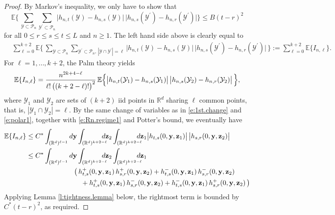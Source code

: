 \documentclass[11pt]{amsart}
\numberwithin{equation}{section}
\theoremstyle{plain}
\theoremstyle{definition}
\begin{document}
\begin{proof}
By Markov's inequality, we only have to show that
\begin{equation}  \label{e:tightness.poisson}
{\mathbb{E}} \biggl\{ \, \sum_{{{\mathcal{Y}}} \subset {\mathcal P_n}} \sum_{{{\mathcal{Y}^{\prime}}} \subset {\mathcal P_n}} \bigl| h_{n,t}({{\mathcal{Y}}}) - h_{n,s}({{\mathcal{Y}}}) \bigr|\, \bigl| h_{n,s}({{\mathcal{Y}^{\prime}}}) - h_{n,r}({{\mathcal{Y}^{\prime}}}) \bigr| \biggr\} \leq B(t-r)^2
\end{equation}
for all $0 \leq r \leq s \leq t \leq L$ and $n \geq 1$. The left hand side above is clearly equal to
\begin{align*}
&\sum_{\ell = 0}^{k+2} {\mathbb{E}} \biggl\{ \, \sum_{{{\mathcal{Y}}} \subset {\mathcal P_n}} \sum_{{{\mathcal{Y}^{\prime}}} \subset {\mathcal P_n}, \, |{{\mathcal{Y}}} \cap {{\mathcal{Y}^{\prime}}}| = \ell} \bigl| h_{n,t}({{\mathcal{Y}}}) - h_{n,s}({{\mathcal{Y}}}) \bigr|\, \bigl| h_{n,s}({{\mathcal{Y}^{\prime}}}) - h_{n,r}({{\mathcal{Y}^{\prime}}}) \bigr|\, \biggr\} := \sum_{\ell =0}^{k+2} {\mathbb{E}} \{ I_{n,\ell} \}.
\end{align*}
For $\ell = 1,\dots,k+2$, the Palm theory yields
$$
{\mathbb{E}} \{ I_{n,\ell} \} = \frac{n^{2k+4-\ell}}{\ell !\, \bigl( (k+2-\ell)! \bigr)^2}\, {\mathbb{E}} \Bigl\{ \bigl|  h_{n,t}({{\mathcal{Y}}}_1) - h_{n,s}({{\mathcal{Y}}}_1) \bigr|\,  \bigl|  h_{n,s}({{\mathcal{Y}}}_2) - h_{n,r}({{\mathcal{Y}}}_2) \bigr|\,  \Bigr\},
$$
where ${{\mathcal{Y}}}_1$ and ${{\mathcal{Y}}}_2$  are sets of $(k+2)$ iid points in ${{\mathbb R}}^d$ sharing $\ell$ common points, that is, $|  {{\mathcal{Y}}}_1 \cap {{\mathcal{Y}}}_2 | = \ell$. By the same change of variables as in \eqref{e:1st.change} and \eqref{e:polar1}, together with \eqref{e:Rn.regime1} and Potter's bound, we eventually have
\begin{align*}
{\mathbb{E}} \{  I_{n,\ell}\} &\leq C^* \int_{({{\mathbb R}}^d)^{\ell -1}}d {{\bf y}} \int_{({{\mathbb R}}^d)^{k+2-\ell}}\hspace{-10pt} d {{\bf z}}_2 \int_{({{\mathbb R}}^d)^{k+2-\ell}}\hspace{-10pt}d {{\bf z}}_1 \bigl| h_{t,s}(0,{{\bf y}},{{\bf z}}_1)  \bigr|\, \bigl| h_{s,r}(0,{{\bf y}},{{\bf z}}_2)  \bigr|  \\
&\leq C^* \int_{({{\mathbb R}}^d)^{\ell -1}}d {{\bf y}} \int_{({{\mathbb R}}^d)^{k+2-\ell}}\hspace{-10pt} d {{\bf z}}_2 \int_{({{\mathbb R}}^d)^{k+2-\ell}}\hspace{-10pt}d {{\bf z}}_1 \\
&\qquad \qquad \qquad \quad \bigl( \, h_{t,s}^+(0,{{\bf y}},{{\bf z}}_1)\, h_{s,r}^+(0,{{\bf y}},{{\bf z}}_2) + h_{t,s}^-(0,{{\bf y}},{{\bf z}}_1)\, h_{s,r}^-(0,{{\bf y}},{{\bf z}}_2) \\
&\qquad \qquad \qquad \qquad + h_{t,s}^+(0,{{\bf y}},{{\bf z}}_1)\, h_{s,r}^-(0,{{\bf y}},{{\bf z}}_2) + h_{t,s}^-(0,{{\bf y}},{{\bf z}}_1)\, h_{s,r}^+(0,{{\bf y}},{{\bf z}}_2) \, \bigr)
\end{align*}
Applying Lemma \ref{l:tightness.lemma} below, the rightmost term is bounded by $C^* (t-r)^2$, as required.


\end{proof}
\end{document}
